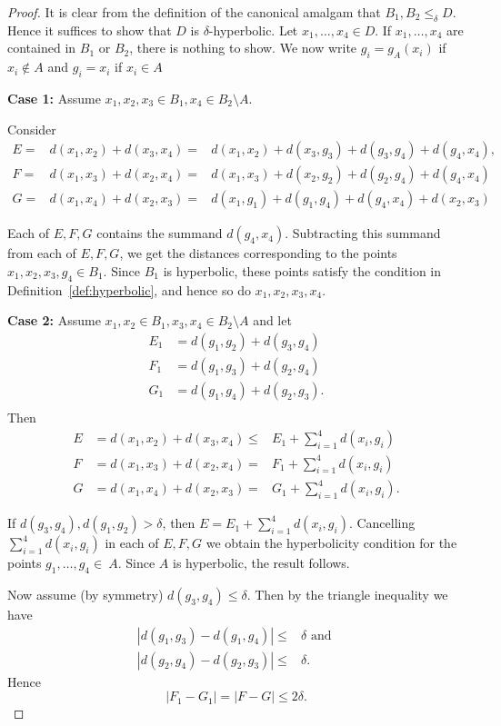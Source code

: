 \documentclass[10pt,a4paper]{amsart}
\renewcommand{\d}{\delta}
\begin{document}
\begin{proof}
It is clear from the definition of the canonical amalgam that $B_1, B_2\leq_\d D$. Hence it suffices to show that $D$ is $\d$-hyperbolic. 
 Let $x_1,\ldots, x_4\in D$. 
If $x_1,\ldots, x_4$ are contained in $B_1$ or $B_2$, there is nothing to show. 
We now write $g_i=g_A(x_i)$ if $x_i\notin A$ and $g_i=x_i$ if $x_i\in A$

\medskip\noindent
{\bf Case 1:} Assume $x_1,x_2,x_3\in B_1, x_4\in B_2\setminus A$.


Consider 
\begin{align*}
E=& d(x_1, x_2)+d(x_3,x_4)=&d(x_1,x_2)+d(x_3,g_3)+d(g_3,g_4)+d(g_4,x_4),\\
 F=& d(x_1, x_3)+d(x_2,x_4)=&d(x_1, x_3)+d(x_2,g_2)+d(g_2,g_4)+d(g_4,x_4)\\
 G=& d(x_1, x_4)+d(x_2,x_3)=&d(x_1,g_1)+d(g_1,g_4)+d(g_4, x_4)+d(x_2,x_3)
\end{align*}

Each of $E, F, G$ contains the summand $d(g_4,x_4)$. Subtracting this summand from each of $E, F, G$, we get the distances corresponding to the points $x_1,x_2,x_3,g_4\in B_1$. Since $B_1$ is hyperbolic, these points satisfy the condition in Definition~\ref{def:hyperbolic}, and hence so do $x_1,x_2,x_3, x_4$.

\medskip\noindent
{\bf Case 2:} Assume $x_1,x_2\in B_1, x_3,x_4\in B_2\setminus A$
 and let
\begin{align*}
E_1&=d(g_1,g_2)+d(g_3,g_4)\\
F_1&=d(g_1,g_3)+d(g_2,g_4)\\
G_1&=d(g_1,g_4)+d(g_2,g_3).\\
\end{align*}
Then
\begin{align*}
E&=d(x_1, x_2)+d(x_3,x_4)\leq & E_1+\sum_{i=1}^4 d(x_i,g_i) \\
 F&=d(x_1, x_3)+d(x_2,x_4)= & F_1+\sum_{i=1}^4 d(x_i,g_i) \\
 G&=d(x_1, x_4)+d(x_2,x_3)= & G_1+\sum_{i=1}^4 d(x_i,g_i).
\end{align*}




If  $d(g_3, g_4), d(g_1,g_2)>\d$, then $E=E_1+\sum_{i=1}^4 d(x_i,g_i)$. Cancelling $\sum_{i=1}^4 d(x_i,g_i)$  in each of $E,F, G$ we obtain the hyperbolicity condition for the points $g_1,\ldots, g_4\in~A$. Since $A$ is hyperbolic, the result follows.

Now assume (by symmetry) $d(g_3,g_4)\leq \d$. Then by the triangle inequality we have
\begin{align*}
|d(g_1,g_3)-d(g_1,g_4)|\leq& \d \mbox{  and } \\
|d(g_2,g_4)-d(g_2,g_3)|\leq &\d.
\end{align*}
 Hence
\begin{equation}\label{eq: amalgam}
|F_1-G_1|=|F-G|\leq 2\d.
\end{equation}


\end{proof}
\end{document}

